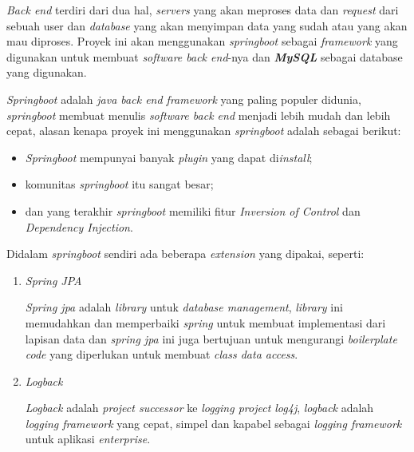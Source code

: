 \documentclass[a4paper]{article}
\begin{document}
\begin{enumerate}[label=\alph*. ]
\begin{enumerate}
                    \textit{Back end} terdiri dari dua hal, \textit{servers} yang akan meproses data dan \textit{request} dari sebuah user dan \textit{database} yang akan menyimpan data yang sudah atau yang akan mau diproses\autocite{codecademy-backend}. Proyek ini akan menggunakan \textit{springboot} sebagai \textit{framework} yang digunakan untuk membuat \textit{software back end}-nya dan \textit{\textbf{MySQL}} sebagai database yang digunakan.

                    \textit{Springboot} adalah \textit{java back end framework} yang paling populer didunia, \textit{springboot} membuat menulis \textit{software back end} menjadi lebih mudah dan lebih cepat\autocite{spring-framework}, alasan kenapa proyek ini menggunakan \textit{springboot} adalah sebagai berikut:
                    \begin{itemize}
                        \item \textit{Springboot} mempunyai banyak \textit{plugin} yang dapat di\textit{install};
                        \item komunitas \textit{springboot} itu sangat besar;
                        \item dan yang terakhir \textit{springboot} memiliki fitur \textit{Inversion of Control} dan \textit{Dependency Injection}.
                    \end{itemize}

                    Didalam \textit{springboot} sendiri ada beberapa \textit{extension} yang dipakai, seperti:
                    \begin{enumerate}
                        \item \textit{Spring JPA}

                        \textit{Spring jpa} adalah \textit{library} untuk \textit{database management}, \textit{library} ini memudahkan dan memperbaiki \textit{spring} untuk membuat implementasi dari lapisan data dan \textit{spring jpa} ini juga bertujuan untuk mengurangi \textit{boilerplate code} yang diperlukan untuk membuat \textit{class data access}\autocite{spring-jpa}.

                        \item \textit{Logback}

                        \textit{Logback} adalah \textit{project successor} ke \textit{logging project log4j}, \textit{logback} adalah \textit{logging framework} yang cepat, simpel dan kapabel sebagai \textit{logging framework} untuk aplikasi \textit{enterprise}\autocite{logback}.


\end{enumerate}
\end{enumerate}
\end{enumerate}
\end{document}
